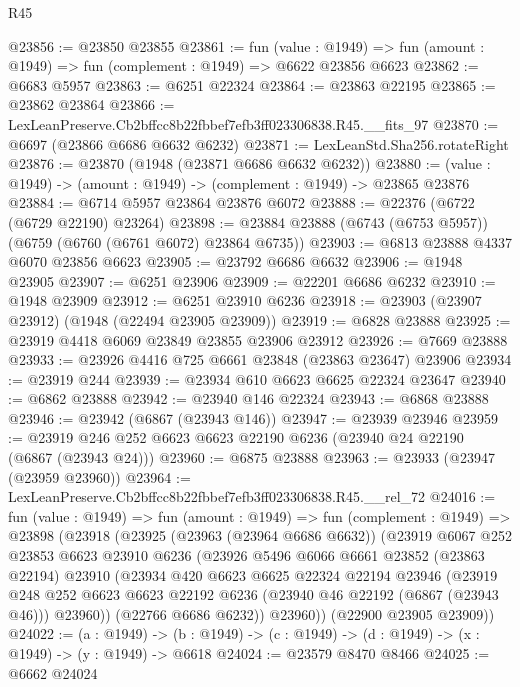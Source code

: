 \begin{lexlean}{R45}
\begin{coremodule}
{@23856 := @23850 @23855
@23861 := fun (value : @1949) =>
  fun (amount : @1949) => fun (complement : @1949) => @6622 @23856 @6623
@23862 := @6683 @5957
@23863 := @6251 @22324
@23864 := @23863 @22195
@23865 := @23862 @23864
@23866 := LexLeanPreserve.Cb2bffcc8b22fbbef7efb3ff023306838.R45.__fits_97
@23870 := @6697 (@23866 @6686 @6632 @6232)
@23871 := LexLeanStd.Sha256.rotateRight
@23876 := @23870 (@1948 (@23871 @6686 @6632 @6232))
@23880 := (value : @1949) -> (amount : @1949) -> (complement : @1949) -> @23865 @23876
@23884 := @6714 @5957 @23864 @23876 @6072
@23888 := @22376 (@6722 (@6729 @22190) @23264)
@23898 := @23884 @23888 (@6743 (@6753 @5957)) (@6759 (@6760 (@6761 @6072) @23864 @6735))
@23903 := @6813 @23888 @4337 @6070 @23856 @6623
@23905 := @23792 @6686 @6632
@23906 := @1948 @23905
@23907 := @6251 @23906
@23909 := @22201 @6686 @6232
@23910 := @1948 @23909
@23912 := @6251 @23910 @6236
@23918 := @23903 (@23907 @23912) (@1948 (@22494 @23905 @23909))
@23919 := @6828 @23888
@23925 := @23919 @4418 @6069 @23849 @23855 @23906 @23912
@23926 := @7669 @23888
@23933 := @23926 @4416 @725 @6661 @23848 (@23863 @23647) @23906
@23934 := @23919 @244
@23939 := @23934 @610 @6623 @6625 @22324 @23647
@23940 := @6862 @23888
@23942 := @23940 @146 @22324
@23943 := @6868 @23888
@23946 := @23942 (@6867 (@23943 @146))
@23947 := @23939 @23946
@23959 := @23919 @246 @252 @6623 @6623 @22190 @6236 (@23940 @24 @22190 (@6867 (@23943 @24)))
@23960 := @6875 @23888
@23963 := @23933 (@23947 (@23959 @23960))
@23964 := LexLeanPreserve.Cb2bffcc8b22fbbef7efb3ff023306838.R45.__rel_72
@24016 := fun (value : @1949) =>
  fun (amount : @1949) =>
  fun (complement : @1949) =>
  @23898
    (@23918
      (@23925
        (@23963 (@23964 @6686 @6632))
        (@23919
          @6067
          @252
          @23853
          @6623
          @23910
          @6236
          (@23926
            @5496
            @6066
            @6661
            @23852
            (@23863 @22194)
            @23910
            (@23934
              @420
              @6623
              @6625
              @22324
              @22194
              @23946
              (@23919
                @248
                @252
                @6623
                @6623
                @22192
                @6236
                (@23940 @46 @22192 (@6867 (@23943 @46)))
                @23960))
            (@22766 @6686 @6232))
          @23960))
      (@22900 @23905 @23909))
@24022 := (a : @1949) ->
  (b : @1949) -> (c : @1949) -> (d : @1949) -> (x : @1949) -> (y : @1949) -> @6618
@24024 := @23579 @8470 @8466
@24025 := @6662 @24024
}
\end{coremodule}
\end{lexlean}
